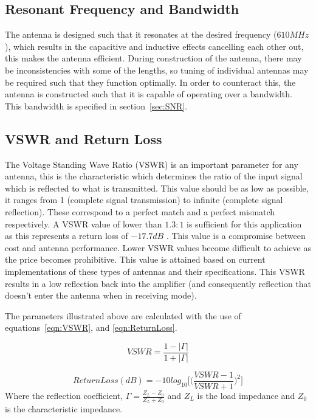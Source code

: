 \documentclass[11pt]{witseiepaper}
\begin{document}
\subsection{Resonant Frequency and Bandwidth} \label{sec:ResonantFrequencyandBandwidth}
The antenna is designed such that it resonates at the desired frequency ($610 MHz$), which results in the capacitive and inductive effects cancelling each other out, this makes the antenna efficient. During construction of the antenna, there may be inconsistencies with some of the lengths, so tuning of individual antennas may be required such that they function optimally. In order to counteract this, the antenna is constructed such that it is capable of operating over a bandwidth. This bandwidth is specified in section~\ref{sec:SNR}.


\subsection{VSWR and Return Loss} \label{sec:VSRWandReturnLoss}
The Voltage Standing Wave Ratio (VSWR) is an important parameter for any antenna, this is the characteristic which determines the ratio of the input signal which is reflected to what is transmitted. This value should be as low as possible, it ranges from 1 (complete signal transmission) to infinite (complete signal reflection). These correspond to a perfect match and a perfect mismatch respectively.
A VSWR value of lower than $1.3:1$ is sufficient for this application as this represents a return loss of $-17.7 dB$ \cite{AntennaPrice1,AntennaPrice2,AntennaPrice3,AntennaPrice4}. This value is a compromise between cost and antenna performance. Lower VSWR values become difficult to achieve as the price becomes prohibitive. This value is attained based on current implementations of these types of antennas and their specifications.
This VSWR results in a low reflection back into the amplifier (and consequently reflection that doesn't enter the antenna when in receiving mode).

The parameters illustrated above are calculated with the use of equations~\ref{eqn:VSWR}, and \ref{eqn:ReturnLoss}.


\begin{equation} \label{eqn:VSWR}
VSWR = \frac{1 - |\Gamma|}{1 + |\Gamma|}
\end{equation}

\begin{equation} \label{eqn:ReturnLoss}
Return Loss (dB) = -10 log_{10} \Bigg[ \Big(\frac{VSWR - 1}{VSWR + 1} \Big)^2 \Bigg]
\end{equation}
Where the reflection coefficient, $\Gamma = \frac{Z_L - Z_0}{Z_L + Z_0}$ and $Z_L$ is the load impedance and $Z_0$ is the characteristic impedance.
\end{document}
